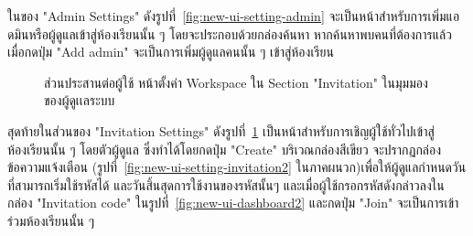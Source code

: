\documentclass[12pt,one side,openright,a4paper]{cpe-thesis-th}
\newcommand{\thaijustify}[1]{%
  \par\hspace{30pt}\justifying
  #1
}
\begin{document}
\thaijustify{
  ในของ "Admin Settings" ดังรูปที่~\ref{fig:new-ui-setting-admin} จะเป็นหน้าสำหรับการเพิ่มแอดมินหรือผู้ดูแลเข้าสู่ห้องเรียนนั้น ๆ โดยจะประกอบด้วยกล่องค้นหา หากค้นหาพบคนที่ต้องการแล้ว เมื่อกดปุ่ม "Add admin" จะเป็นการเพิ่มผู้ดูแลคนนั้น ๆ เข้าสู่ห้องเรียน
}

\hypertarget{new-ui-setting-invitation1}{
  \begin{figure}[H]
    \centering
    \caption[ส่วนประสานต่อผู้ใช้ หน้าตั้งค่า Workspace ของผู้ดูเเลระบบ (ใน "Invitation")]{ส่วนประสานต่อผู้ใช้ หน้าตั้งค่า Workspace ใน Section "Invitation" ในมุมมองของผู้ดูเเลระบบ}
    \label{fig:new-ui-setting-invitation1}
  \end{figure}
}

\thaijustify{
  สุดท้ายในส่วนของ "Invitation Settings" ดังรูปที่~\ref{fig:new-ui-setting-invitation1} เป็นหน้าสำหรับการเชิญผู้ใช้ทั่วไปเข้าสู่ห้องเรียนนั้น ๆ โดยตัวผู้ดูแล ซึ่งทำได้โดยกดปุ่ม "Create" บริเวณกล่องสีเขียว จะปรากฏกล่องข้อความแจ้งเตือน (รูปที่~\ref{fig:new-ui-setting-invitation2} ในภาคผนวก)เพื่อให้ผู้ดูแลกำหนดวันที่สามารถเริ่มใช้รหัสได้ และวันสิ้นสุดการใช้งานของรหัสนั้นๆ และเมื่อผู้ใช้กรอกรหัสดังกล่าวลงในกล่อง "Invitation code" ในรูปที่~\ref{fig:new-ui-dashboard2} และกดปุ่ม "Join" จะเป็นการเข้าร่วมห้องเรียนนั้น ๆ
}
\end{document}
